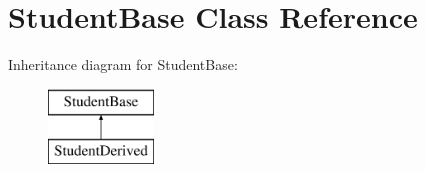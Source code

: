 \hypertarget{class_student_base}{}\section{Student\+Base Class Reference}
\label{class_student_base}
Inheritance diagram for Student\+Base\+:\begin{figure}[H]
\begin{center}
\leavevmode
\includegraphics[height=2.000000cm]{class_student_base}
\end{center}
\end{figure}
